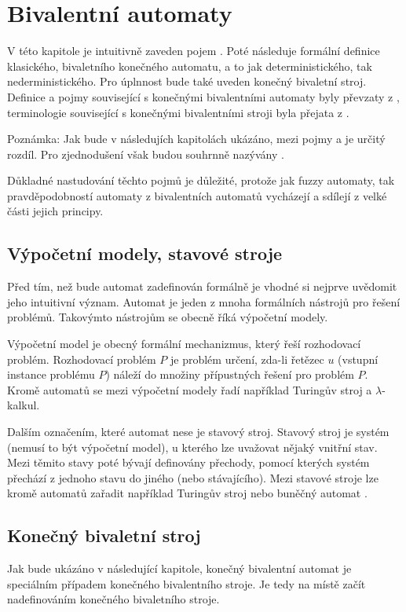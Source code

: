 \documentclass[a4paper,10pt]{article}
\begin{document}


\section{Bivalentní automaty}
V této kapitole je intuitivně zaveden pojem . Poté následuje formální definice klasického, bivaletního konečného automatu, a to jak deterministického, tak nederministického. Pro úplnnost bude také uveden konečný bivaletní stroj. Definice a pojmy související s konečnými bivalentními automaty byly převzaty z \cite{kozen-automata-and-computability}, terminologie související s konečnými bivalentními stroji byla přejata z \cite{modeson-malik-fuzz-aut-and-langs}.

Poznámka: Jak bude v následujích kapitolách ukázáno, mezi pojmy  a  je určitý rozdíl. Pro zjednodušení však budou souhrnně nazývány .

Důkladné nastudování těchto pojmů je důležité, protože jak fuzzy automaty, tak pravděpodobností automaty z bivalentních automatů vycházejí a sdílejí z velké části jejich principy.

\subsection{Výpočetní modely, stavové stroje}
Před tím, než bude automat zadefinován formálně je vhodné si nejprve uvědomit jeho intuitivní význam. Automat je jeden z mnoha formálních nástrojů pro řešení problémů. Takovýmto nástrojům se obecně říká výpočetní modely.

Výpočetní model je obecný formální mechanizmus, který řeší rozhodovací problém. Rozhodovací problém $P$ je problém určení, zda-li řetězec $u$ (vstupní instance problému $P$) náleží do množiny přípustných řešení pro problém $P$. Kromě automatů se mezi výpočetní modely řadí například Turingův stroj a $\lambda$-kalkul.

Dalším označením, které automat nese je stavový stroj. Stavový stroj je systém (nemusí to být výpočetní model), u kterého lze uvažovat nějaký vnitřní stav. Mezi těmito stavy poté bývají definovány přechody, pomocí kterých systém přechází z jednoho stavu do jiného (nebo stávajícího). Mezi stavové stroje lze kromě automatů zařadit například Turingův stroj nebo buněčný automat \cite{kozen-automata-and-computability}. 

\subsection{Konečný bivaletní stroj}
Jak bude ukázáno v následující kapitole, konečný bivalentní automat je speciálním případem konečného bivalentního stroje. Je tedy na místě začít nadefinováním konečného bivaletního stroje.
\end{document}
